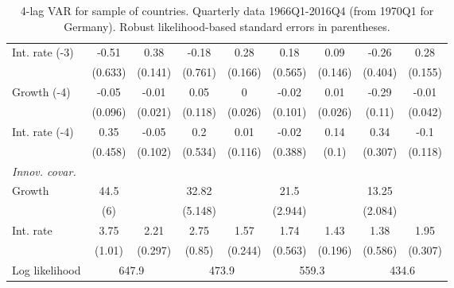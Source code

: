 \begin{table}[htbp]
\begin{tabular}{@{\extracolsep{4pt}}lcccccccc@{}}
\quad Int. rate (-3) 	 &-0.51 	 & 0.38 	 & -0.18 	 & 0.28 	 & 0.18 	 & 0.09 	 & -0.26 	 & 0.28	 \\ 
 		 & (0.633) 	 & (0.141) 	 & (0.761) 	 & (0.166) 	 & (0.565) 	 & (0.146) 	 & (0.404) 	 & (0.155) 	 \\ 
\quad Growth (-4) 	 &-0.05 	 & -0.01 	 & 0.05 	 & 0 	 & -0.02 	 & 0.01 	 & -0.29 	 & -0.01	 \\ 
 		 & (0.096) 	 & (0.021) 	 & (0.118) 	 & (0.026) 	 & (0.101) 	 & (0.026) 	 & (0.11) 	 & (0.042) 	 \\ 
\quad Int. rate (-4) 	 &0.35 	 & -0.05 	 & 0.2 	 & 0.01 	 & -0.02 	 & 0.14 	 & 0.34 	 & -0.1	 \\ 
 		 & (0.458) 	 & (0.102) 	 & (0.534) 	 & (0.116) 	 & (0.388) 	 & (0.1) 	 & (0.307) 	 & (0.118) 	 \\ 
\rule{0pt}{4ex} \emph{Innov. covar.}  	 & 	 & 	 & 	 & 	 & 	 & 	 & 	 &\\ 
\quad Growth 	 &44.5 	 &  	 & 32.82 	 &  	 & 21.5 	 &  	 & 13.25 	 & 	 \\ 
 		 & (6) 	 &  	 & (5.148) 	 &  	 & (2.944) 	 &  	 & (2.084) 	 &  	 \\ 
\quad Int. rate 	 &3.75 	 & 2.21 	 & 2.75 	 & 1.57 	 & 1.74 	 & 1.43 	 & 1.38 	 & 1.95	 \\ 
 		 & (1.01) 	 & (0.297) 	 & (0.85) 	 & (0.244) 	 & (0.563) 	 & (0.196) 	 & (0.586) 	 & (0.307) 	 \\ 
 \hline \rule{0pt}{4ex} 
  Log likelihood 	 &\multicolumn{2}{c}{647.9} 	 & \multicolumn{2}{c}{473.9} 	 & \multicolumn{2}{c}{559.3} 	 & \multicolumn{2}{c}{434.6}\\ 

 \hline 	\end{tabular}		\caption{4-lag VAR for sample of countries. Quarterly data 1966Q1-2016Q4
                      (from 1970Q1 for Germany). Robust likelihood-based
                      standard errors in parentheses.}
		\label{tab:all_4lag}

\end{table}